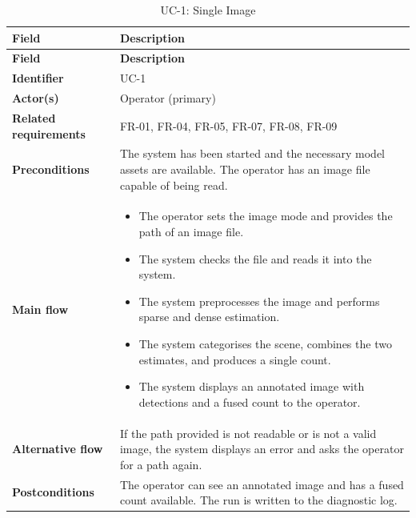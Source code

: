 \begin{longtable}{|
    >{\raggedright\arraybackslash}p{3.0cm}|
    >{\raggedright\arraybackslash}p{\dimexpr\textwidth-3.0cm-4\tabcolsep-3\arrayrulewidth\relax}|
}
\caption{UC-1: Single Image}
\label{tab:uc1} \\

\hline
\textbf{Field} & \textbf{Description} \\
\hline
\endfirsthead

\hline
\textbf{Field} & \textbf{Description} \\
\hline
\endhead

\textbf{Identifier} &
UC-1
\\
\hline

\textbf{Actor(s)} &
Operator (primary)
\\
\hline

\textbf{Related requirements} &
FR-01, FR-04, FR-05, FR-07, FR-08, FR-09
\\
\hline

\textbf{Preconditions} &
The system has been started and the necessary model assets are available. The operator has an image file capable of being read.
\\
\hline

\textbf{Main flow} &
\begin{itemize}[leftmargin=16pt, itemsep=0pt, topsep=0pt]
    \item The operator sets the image mode and provides the path of an image file.

    \item The system checks the file and reads it into the system.

    \item The system preprocesses the image and performs sparse and dense estimation.

    \item The system categorises the scene, combines the two estimates, and produces a single count.

    \item The system displays an annotated image with detections and a fused count to the operator.
\end{itemize}
\\
\hline

\textbf{Alternative flow} &
If the path provided is not readable or is not a valid image, the system displays an error and asks the operator for a path again.
\\
\hline

\textbf{Postconditions} &
The operator can see an annotated image and has a fused count available. The run is written to the diagnostic log.
\\
\hline

\end{longtable}

